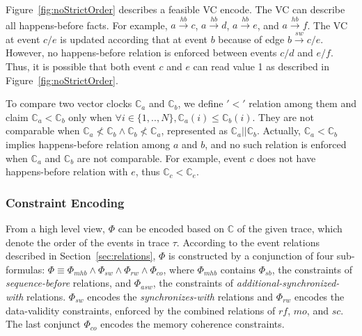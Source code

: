 \documentclass[preprint, numbers, 10pt]{sigplanconf}
\begin{document}
Figure~\ref{fig:noStrictOrder} describes a feasible VC encode. 
The VC can describe all happens-before facts. 
For example, $a \stackrel{hb}{\longrightarrow} c$, $a \stackrel{hb}{\longrightarrow} d$,
$a \stackrel{hb}{\longrightarrow} e$, and $a \stackrel{hb}{\longrightarrow} f$. 
The VC at event $c/e$ is updated according that at event $b$ because of edge 
$b \stackrel{sw}{\longrightarrow} c/e$. 
However, no happens-before relation is enforced between events  $c/d$ and
$e/f$. Thus, it is possible that both event $c$ and $e$ can read value 1 as described
in Figure~\ref{fig:noStrictOrder}. 


To compare two vector clocks
$\mathbb{C}_a$ and $\mathbb{C}_b$, we define $'<'$ relation among them and
claim $\mathbb{C}_a < \mathbb{C}_b$ only when $\forall i\in \{1,..,N\}, \mathbb{C}_a(i)\leq \mathbb{C}_b(i)$. 
They are not comparable when $\mathbb{C}_a\not<\mathbb{C}_b\wedge\mathbb{C}_b\not<\mathbb{C}_a$, 
represented as $\mathbb{C}_a ||\mathbb{C}_b$. 
Actually, $\mathbb{C}_a < \mathbb{C}_b$ implies happens-before relation among $a$ and $b$, 
and no such relation is enforced when $\mathbb{C}_a$ and $\mathbb{C}_b$ are not comparable.
For example, event $c$ does not have happens-before relation with $e$, thus $\mathbb{C}_c < \mathbb{C}_e$.


\subsubsection{Constraint Encoding}

From a high level view, $\Phi$ can be encoded based on $\mathbb{C}$ of the given trace, which denote
the order of the events in trace $\tau$. According to the event relations described
in Section~\ref{sec:relations}, $\Phi$ is constructed by a 
conjunction of four sub-formulas: $\Phi\equiv\Phi_{mhb}\wedge\Phi_{sw} \wedge\Phi_{rw}\wedge\Phi_{co}$,
where $\Phi_{mhb}$ contains $\Phi_{sb}$, the constraints of \textit{sequence-before} relations, 
and $\Phi_{asw}$, the constraints of \textit{additional-synchronized-with} relations. 
$\Phi_{sw}$ encodes the \textit{synchronizes-with} relations and 
$\Phi_{rw}$ encodes the data-validity constraints, enforced by the combined relations of $rf$, $mo$, and $sc$.  
The last conjunct $\Phi_{co}$ encodes the memory coherence constraints. 
\end{document}

